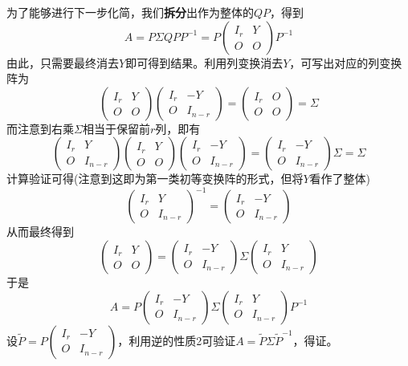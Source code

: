 \documentclass[a4paper,UTF8,fontset=windows]{ctexart}
\begin{document}
\begin{enumerate}
    为了能够进行下一步化简，我们\textbf{拆分}出作为整体的$QP$，得到
    $$A=P\Sigma QPP^{-1}=P\begin{pmatrix}I_r&Y\\O&O\end{pmatrix}P^{-1}$$
    由此，只需要最终消去$Y$即可得到结果。利用列变换消去$Y$，可写出对应的列变换阵为
    $$\begin{pmatrix}I_r&Y\\O&O\end{pmatrix}\begin{pmatrix}I_r&-Y\\O&I_{n-r}\end{pmatrix}=\begin{pmatrix}I_r&O\\O&O\end{pmatrix}=\Sigma$$
    而注意到右乘$\Sigma$相当于保留前$r$列，即有
    $$\begin{pmatrix}I_r&Y\\O&I_{n-r}\end{pmatrix}\begin{pmatrix}I_r&Y\\O&O\end{pmatrix}\begin{pmatrix}I_r&-Y\\O&I_{n-r}\end{pmatrix}=\begin{pmatrix}I_r&-Y\\O&I_{n-r}\end{pmatrix}\Sigma=\Sigma$$
    计算验证可得(注意到这即为第一类初等变换阵的形式，但将$Y$看作了整体)
    $$\begin{pmatrix}I_r&Y\\O&I_{n-r}\end{pmatrix}^{-1}=\begin{pmatrix}I_r&-Y\\O&I_{n-r}\end{pmatrix}$$
    从而最终得到
    $$\begin{pmatrix}I_r&Y\\O&O\end{pmatrix}=\begin{pmatrix}I_r&-Y\\O&I_{n-r}\end{pmatrix}\Sigma\begin{pmatrix}I_r&Y\\O&I_{n-r}\end{pmatrix}$$
    于是
    $$A=P\begin{pmatrix}I_r&-Y\\O&I_{n-r}\end{pmatrix}\Sigma\begin{pmatrix}I_r&Y\\O&I_{n-r}\end{pmatrix}P^{-1}$$
    设$\tilde{P}=P\begin{pmatrix}I_r&-Y\\O&I_{n-r}\end{pmatrix}$，利用逆的性质2可验证$A=\tilde{P}\Sigma\tilde{P}^{-1}$，得证。


\end{enumerate}
\end{document}
